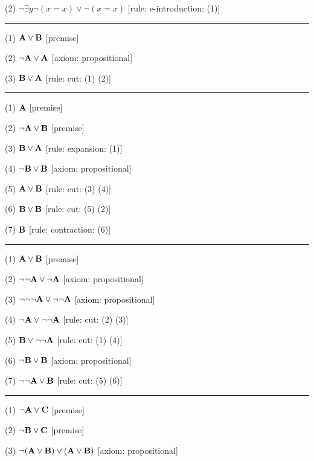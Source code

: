 \item{(2)} $\neg \exists y \neg (x = x) \lor \neg (x = x)$ \hfill [rule: e-introduction: (1)]
\medskip
\hrule
\medskip
\item{(1)} ${\bf A} \lor {\bf B}$ \hfill [premise]
\item{(2)} $\neg {\bf A} \lor {\bf A}$ \hfill [axiom: propositional]
\item{(3)} ${\bf B} \lor {\bf A}$ \hfill [rule: cut: (1) (2)]
\medskip
\hrule
\medskip
\item{(1)} ${\bf A}$ \hfill [premise]
\item{(2)} $\neg {\bf A} \lor {\bf B}$ \hfill [premise]
\item{(3)} ${\bf B} \lor {\bf A}$ \hfill [rule: expansion: (1)]
\item{(4)} $\neg {\bf B} \lor {\bf B}$ \hfill [axiom: propositional]
\item{(5)} ${\bf A} \lor {\bf B}$ \hfill [rule: cut: (3) (4)]
\item{(6)} ${\bf B} \lor {\bf B}$ \hfill [rule: cut: (5) (2)]
\item{(7)} ${\bf B}$ \hfill [rule: contraction: (6)]
\medskip
\hrule
\medskip
\item{(1)} ${\bf A} \lor {\bf B}$ \hfill [premise]
\item{(2)} $\neg \neg {\bf A} \lor \neg {\bf A}$ \hfill [axiom: propositional]
\item{(3)} $\neg \neg \neg {\bf A} \lor \neg \neg {\bf A}$ \hfill [axiom: propositional]
\item{(4)} $\neg {\bf A} \lor \neg \neg {\bf A}$ \hfill [rule: cut: (2) (3)]
\item{(5)} ${\bf B} \lor \neg \neg {\bf A}$ \hfill [rule: cut: (1) (4)]
\item{(6)} $\neg {\bf B} \lor {\bf B}$ \hfill [axiom: propositional]
\item{(7)} $\neg \neg {\bf A} \lor {\bf B}$ \hfill [rule: cut: (5) (6)]
\medskip
\hrule
\medskip
\item{(1)} $\neg {\bf A} \lor {\bf C}$ \hfill [premise]
\item{(2)} $\neg {\bf B} \lor {\bf C}$ \hfill [premise]
\item{(3)} $\neg ({\bf A} \lor {\bf B}) \lor ({\bf A} \lor {\bf B})$ \hfill [axiom: propositional]
